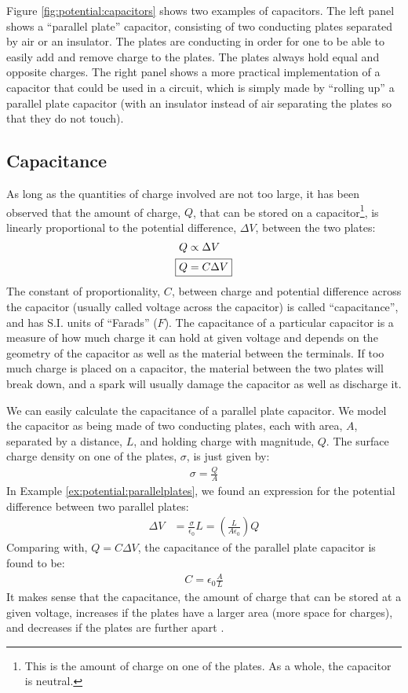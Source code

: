 Figure \ref{fig:potential:capacitors} shows two examples of capacitors. The left panel shows a ``parallel plate'' capacitor, consisting of two conducting plates separated by air or an insulator. The plates are conducting in order for one to be able to easily add and remove charge to the plates. The plates always hold equal and opposite charges. The right panel shows a more practical implementation of a capacitor that could be used in a circuit, which is simply made by ``rolling up'' a parallel plate capacitor (with an insulator instead of air separating the plates so that they do not touch). 
\subsection{Capacitance}
As long as the quantities of charge involved are not too large, it has been observed that the amount of charge, $Q$, that can be stored on a capacitor\footnote{This is the amount of charge on one of the plates. As a whole, the capacitor is neutral.}, is linearly proportional to the potential difference, $\Delta V$, between the two plates:
\begin{align*}
Q&\propto \Delta V\\
\Aboxed{Q&=C\Delta V}\\
\end{align*}
The constant of proportionality, $C$, between charge and potential difference across the capacitor (usually called voltage across the capacitor) is called ``capacitance'', and has S.I. units of ``Farads'' ($F$). The capacitance of a particular capacitor is a measure of how much charge it can hold at given voltage and depends on the geometry of the capacitor as well as the material between the terminals. If too much charge is placed on a capacitor, the material between the two plates will break down, and a spark will usually damage the capacitor as well as discharge it.

We can easily calculate the capacitance of a parallel plate capacitor. We model the capacitor as being made of two conducting plates, each with area, $A$, separated by a distance, $L$, and holding charge with magnitude, $Q$. The surface charge density on one of the plates, $\sigma$, is just given by:
\begin{align*}
\sigma =\frac{Q}{A}
\end{align*} 
In Example \ref{ex:potential:parallelplates}, we found an expression for the potential difference between two parallel plates:
\begin{align*}
\Delta V &= \frac{\sigma}{\epsilon_0}L=\left(\frac{L}{A\epsilon_0}\right)Q
\end{align*}
Comparing with, $Q=C\Delta V$, the capacitance of the parallel plate capacitor is found to be:
\begin{align*}
C=\epsilon_0\frac{A}{L}
\end{align*}
It makes sense that the capacitance, the amount of charge that can be stored at a given voltage, increases if the plates have a larger area (more space for charges), and decreases if the plates are further apart . %


